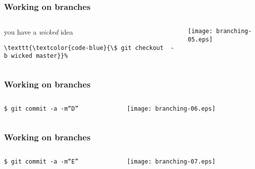 \documentclass[english]{beamer}
\newcommand{\CMD}[1]{%
\texttt{\textcolor{code-blue}{#1}}%
}
\begin{document}
\begin{frame}[fragile]
\frametitle{Working on branches}

\begin{columns}[t]
        \begin{column}[T]{.5\textwidth}
                you have a {\em wicked} idea

                \vspace{\baselineskip}
                {\small
                \begin{Verbatim}[commandchars=\\\{\}]
\CMD{\$ git checkout  -b wicked master}
                \end{Verbatim}
                }

        \end{column}
        \begin{column}[T]{.5\textwidth}
                \texttt{[image: branching-05.eps]}
        \end{column}
\end{columns}
\end{frame}

\begin{frame}
\frametitle{Working on branches}

\begin{columns}[t]
        \begin{column}[T]{.5\textwidth}
                {\small
                \CMD{\$ git commit -a -m``D''} \\
                }
        \end{column}
        \begin{column}[T]{.5\textwidth}
                \texttt{[image: branching-06.eps]}
        \end{column}
\end{columns}
\end{frame}

\begin{frame}
\frametitle{Working on branches}

\begin{columns}[t]
        \begin{column}[T]{.5\textwidth}
                {\small
                \CMD{\$ git commit -a -m``E''} \\
                }
        \end{column}
        \begin{column}[T]{.5\textwidth}
                \texttt{[image: branching-07.eps]}
        \end{column}
\end{columns}
\end{frame}
\end{document}
